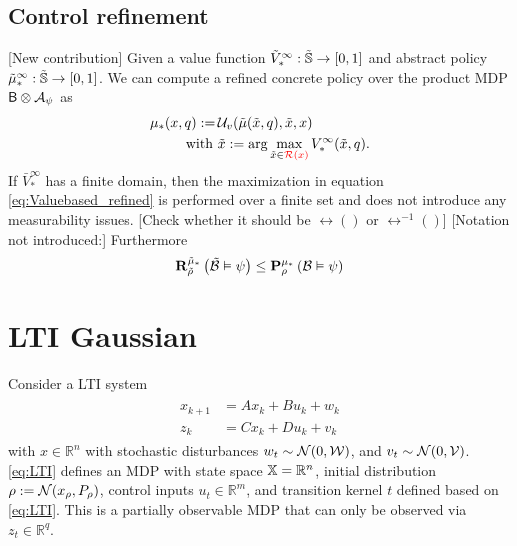\documentclass{ifacconf}
\newcommand{\red}[1]{{\color{red} #1}}
\begin{document}
\subsection{Control refinement}
\red{[New contribution]}
Given a value function 
	$\tilde V^\infty_\ast:\tilde\S \rightarrow [0,1]$ and abstract policy 	$\tilde  \pol^\infty_\ast:\tilde\S \rightarrow [0,1]$. We can compute a refined  concrete policy over the product MDP $\MB\otimes\FSA_\psi$ as
	\begin{align}\label{eq:Valuebased_refined}
		\pol_\ast(x,q):=\, &\InF( \tilde{\pol}(\tilde x, q), \tilde x, x) \\ \mbox{ with } &\tilde x:=\arg\max_{ \tilde x\in\red
		{\rel(x)}} \bar V^\infty_\ast(\tilde x,q).
	\end{align}
If  $\bar V^\infty_\ast$ has a finite domain, then  the maximization in equation \eqref{eq:Valuebased_refined} is performed over a finite set and does not introduce any measurability issues. 
	\red{[Check whether it should be $\rel()$ or $\rel^{-1}()$] }
	\red{[Notation not introduced:]}
	Furthermore
\begin{align}
  \mathbf R^{\tilde \pol_\ast}_{\tilde\rho}\left(
\tilde{\mathcal{B}}
 \vDash \psi \right)\leq   \mathbf P^{ \pol_\ast} _{ \rho}\left(
 {\mathcal{B}}
 \vDash \psi \right)
\end{align}
	


\section{LTI Gaussian}\label{sec:case}

Consider a LTI system
 \begin{align} \label{eq:LTI} \begin{aligned}
x_{k+1}&=A x_{k} + B u_k+ w_k\\
z_k&=Cx_k+Du_k+v_k\end{aligned} \end{align}
with $x\in \mathbb{R}^n$ with stochastic disturbances $w_t\sim \mathcal N(0,\CA W)$,  and $v_t\sim \mathcal N(0,\CA V)$. 
 \eqref{eq:LTI}  defines an MDP with state space $\X=\mathbb R^n$,  initial distribution  $\init:=\mathcal N(x_\init,P_\init)$,  control inputs $u_t\in\mathbb R^m$, and transition kernel $t$ defined based on  \eqref{eq:LTI}. This is a partially observable MDP that can only be observed via  $z_t\in\mathbb R^q$.
 
\end{document}
